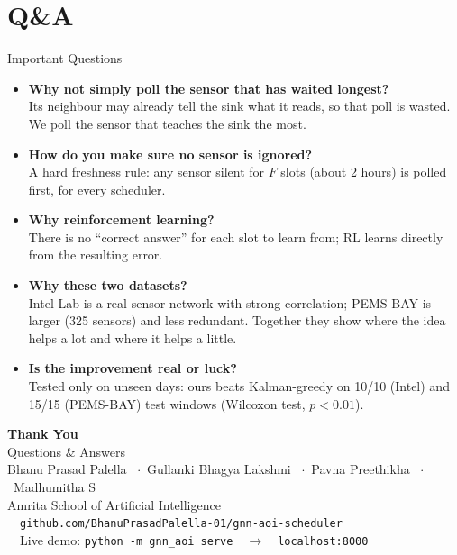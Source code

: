 \documentclass[aspectratio=169,10pt,xcolor=table]{beamer}
\begin{document}
\section*{Q\&A}
\begin{frame}{Important Questions}
  \begin{itemize}\setlength\itemsep{0.6em}
    \item {\color{accent}\textbf{Why not simply poll the sensor that has waited longest?}}\\
      {\small Its neighbour may already tell the sink what it reads, so that poll is wasted. We poll the sensor that teaches the sink the most.}
    \item {\color{accent}\textbf{How do you make sure no sensor is ignored?}}\\
      {\small A hard freshness rule: any sensor silent for $F$ slots (about 2 hours) is polled first, for every scheduler.}
    \item {\color{accent}\textbf{Why reinforcement learning?}}\\
      {\small There is no ``correct answer'' for each slot to learn from; RL learns directly from the resulting error.}
    \item {\color{accent}\textbf{Why these two datasets?}}\\
      {\small Intel Lab is a real sensor network with strong correlation; PEMS-BAY is larger (325 sensors) and less redundant. Together they show where the idea helps a lot and where it helps a little.}
    \item {\color{accent}\textbf{Is the improvement real or luck?}}\\
      {\small Tested only on unseen days: ours beats Kalman-greedy on 10/10 (Intel) and 15/15 (PEMS-BAY) test windows (Wilcoxon test, $p<0.01$).}
  \end{itemize}
\end{frame}

\begin{frame}
  \centering
  \vspace{1.2cm}
  {\fontsize{30}{36}\selectfont\bfseries Thank You}\\[0.5em]
  {\Large Questions \& Answers}\\[1.5em]
  \small Bhanu Prasad Palella \ $\cdot$\ Gullanki Bhagya Lakshmi \ $\cdot$\ Pavna Preethikha \ $\cdot$\ Madhumitha S\\[0.3em]
  {\color{muted}Amrita School of Artificial Intelligence}\\[1.0em]
  \faGithub\ \ \texttt{github.com/BhanuPrasadPalella-01/gnn-aoi-scheduler}\\[0.3em]
  \faPlayCircle\ \ Live demo: \texttt{python -m gnn\_aoi serve}\ \ $\rightarrow$\ \ \texttt{localhost:8000}
\end{frame}
\end{document}
